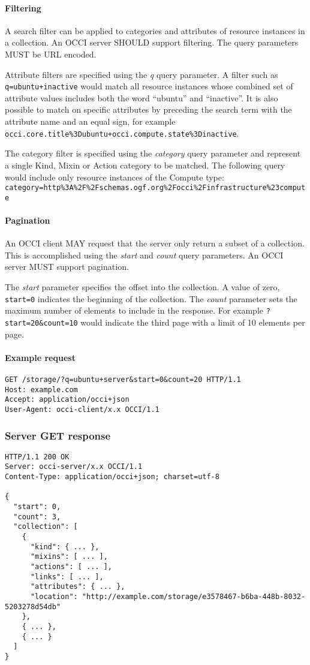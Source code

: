 \documentclass[10pt,a4paper]{article}
\begin{document}
\paragraph*{Filtering} A search filter can be applied to categories and attributes
of resource instances in a collection. An OCCI server SHOULD support filtering.
The query parameters MUST be URL encoded.

Attribute filters are specified using the {\em q} query parameter.  A filter such
as {\tt q=ubuntu+inactive} would match all resource instances whose combined
set of attribute values includes both the word ``ubuntu'' and ``inactive''. It
is also possible to match on specific attributes by preceding the search term
with the attribute name and an equal sign, for example {\tt
occi.core.title\%3Dubuntu+occi.compute.state\%3Dinactive}. 

The category filter is specified using the {\em category} query parameter and
represent a single Kind, Mixin or Action category to be matched. The following
query would include only resource instances of the Compute type:
{\tt category=http\%3A\%2F\%2Fschemas.ogf.org\%2Focci\%2Finfrastructure\%23compute}

\paragraph*{Pagination} An OCCI client MAY request that the server only return
a subset of a collection. This is accomplished using the {\em start} and
{\em count} query parameters.  An OCCI server MUST support pagination.

The {\em start} parameter specifies the offset into the collection. A value of
zero, {\tt start=0} indicates the beginning of the collection.
%
The {\em count} parameter sets the maximum number of elements to include in the
response. For example {\tt ?start=20\&count=10} would indicate the third page
with a limit of 10 elements per page.

\paragraph*{Example request}

\begin{verbatim}
GET /storage/?q=ubuntu+server&start=0&count=20 HTTP/1.1
Host: example.com
Accept: application/occi+json
User-Agent: occi-client/x.x OCCI/1.1
\end{verbatim}

\subsubsection{Server GET response}
\begin{verbatim}
HTTP/1.1 200 OK
Server: occi-server/x.x OCCI/1.1
Content-Type: application/occi+json; charset=utf-8

{
  "start": 0,
  "count": 3,
  "collection": [
    {
      "kind": { ... },
      "mixins": [ ... ],
      "actions": [ ... ],
      "links": [ ... ],
      "attributes": { ... },
      "location": "http://example.com/storage/e3578467-b6ba-448b-8032-5203278d54db"
    },
    { ... },
    { ... }
  ]
}
\end{verbatim}
\end{document}
